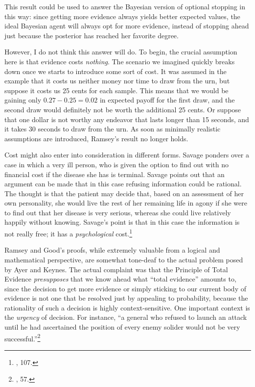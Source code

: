 This result could be used to answer the Bayesian version of optional
stopping in this way: since getting more evidence always yields better
expected values, the ideal Bayesian agent will always opt for more
evidence, instead of stopping ahead just because the posterior has
reached her favorite degree.

However, I do not think this answer will do. To begin, the crucial
assumption here is that evidence costs \emph{nothing}. The scenario we
imagined quickly breaks down once we starts to introduce some sort of
cost. It was assumed in the example that it costs us neither money nor
time to draw from the urn, but suppose it costs us 25 cents for each
sample. This means that we would be gaining only \(0.27-0.25 = 0.02\) in
expected payoff for the first draw, and the second draw would definitely
not be worth the additional 25 cents. Or suppose that one dollar is not
worthy any endeavor that lasts longer than 15 seconds, and it takes 30
seconds to draw from the urn. As soon as minimally realistic assumptions
are introduced, Ramsey's result no longer holds.

Cost might also enter into consideration in different forms. Savage
ponders over a case in which a very ill person, who is given the option
to find out with no financial cost if the disease she has is terminal.
Savage points out that an argument can be made that in this case
refusing information could be rational. The thought is that the patient
may decide that, based on an assessment of her own personality, she
would live the rest of her remaining life in agony if she were to find
out that her disease is very serious, whereas she could live relatively
happily without knowing. Savage's point is that in this case the
information is not really free; it has a \emph{psychological}
cost.\footnote{\cite{savage}, 107.}

Ramsey and Good's proofs, while extremely valuable from a logical and
mathematical perspective, are somewhat tone-deaf to the actual problem
posed by Ayer and Keynes. The actual complaint was that the Principle of
Total Evidence \emph{presupposes} that we know ahead what ``total
evidence'' amounts to, since the decision to get more evidence or simply
sticking to our current body of evidence is not one that be resolved
just by appealing to probability, because the rationality of such a
decision is highly context-sensitive. One important context is the
\emph{urgency} of decision. For instance, ``a general who refused to
launch an attack until he had ascertained the position of every enemy
solider would not be very successful.''\footnote{\cite{ayerpae}, 57.}

